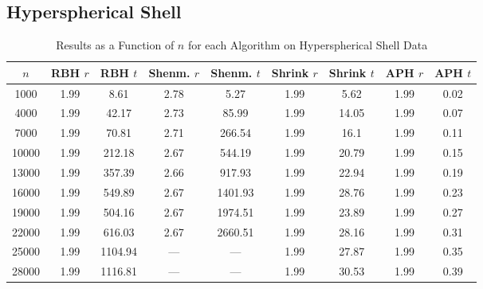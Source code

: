\documentclass[11pt,twoside]{report}
\theoremstyle{definition}
\numberwithin{theorem}{section}
\numberwithin{definition}{section}
\numberwithin{lemma}{section}
\numberwithin{proposition}{section}
\numberwithin{equation}{section}
\numberwithin{figure}{section}
\begin{document}
\begin{appendices}
    
    \subsection{Hyperspherical Shell}
    \begin{table}[ht]
        \centering
        \begin{tabular}{|c||c|c||c|c||c|c||c|c|}\hline
            $n$&RBH $r$&RBH $t$&Shenm. $r$&Shenm. $t$&Shrink $r$&Shrink $t$&APH $r$&APH $t$ \\ \hline
            1000&1.99&8.61&2.78&5.27&1.99&5.62&1.99&0.02 \\
            4000&1.99&42.17&2.73&85.99&1.99&14.05&1.99&0.07 \\
            7000&1.99&70.81&2.71&266.54&1.99&16.1&1.99&0.11 \\
            10000&1.99&212.18&2.67&544.19&1.99&20.79&1.99&0.15 \\
            13000&1.99&357.39&2.66&917.93&1.99&22.94&1.99&0.19 \\
            16000&1.99&549.89&2.67&1401.93&1.99&28.76&1.99&0.23 \\
            19000&1.99&504.16&2.67&1974.51&1.99&23.89&1.99&0.27 \\
            22000&1.99&616.03&2.67&2660.51&1.99&28.16&1.99&0.31 \\
            25000&1.99&1104.94&---&---&1.99&27.87&1.99&0.35 \\
            28000&1.99&1116.81&---&---&1.99&30.53&1.99&0.39 \\ \hline
        \end{tabular}
        \caption{Results as a Function of $n$ for each Algorithm on Hyperspherical Shell Data}
        \label{tab:hyperspherical_shell_table_n}
    \end{table}
    

\end{appendices}
\end{document}
